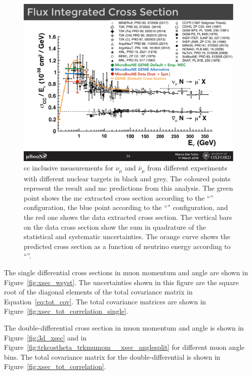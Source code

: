 \begin{figure}[]
\centering
\includegraphics[width=.95\textwidth]{images/total_xsec_pdg_wsyst_2}
\caption[Total Cross Section (Stat. $\oplus$ Syst. Unc.) with Measurements from Different Experiments]{\acrshort{cc} inclusive measurements for $\nu_\mu$ and $\bar{\nu}_\mu$ from different experiments with different nuclear targets in black and grey. The coloured points represent the result and \acrshort{mc} predictions from this analysis. The green point shows the \acrshort{mc} extracted cross section according to the ``\tuneone'' configuration, the blue point according to the ``\tunethree'' configuration, and the red one shows the data extracted cross section. The vertical bars on the data cross section show the sum in quadrature of the statistical and systematic uncertainties. The orange curve shows the \g predicted cross section as a function of neutrino energy according to ``\tuneone''.}
\label{fig:total_xsec_pdg_wsyst}
\end{figure}


The single differential cross sections in muon momentum and angle are shown in Figure~\ref{fig:xsec_wsyst}. The uncertainties shown in this figure are the square root of the diagonal elements of the total covariance matrix in Equation~\eqref{eq:tot_cov}. The total covariance matrices are shown in Figure~\ref{fig:xsec_tot_correlation_single}. 

The double-differential cross section in muon momentum and angle is shown in Figure~\ref{fig:3d_xsec} and in Figure~\ref{fig:trkcostheta_trkmumom__xsec_anglesplit} for different muon angle bins. The total covariance matrix for the double-differential is shown in Figure~\ref{fig:xsec_tot_correlation}. 

